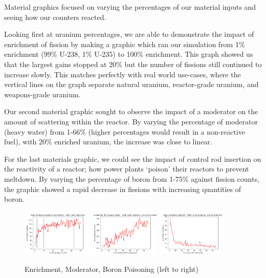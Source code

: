 \documentclass{notes}
\begin{document}
Material graphics focused on varying the percentages of our material inputs and seeing how our counters reacted.

Looking first at uranium percentages, we are able to demonstrate the impact of enrichment of fission by making a graphic which ran our simulation from 1\% enrichment (99\% U-238, 1\% U-235) to 100\% enrichment. This graph showed us that the largest gains stopped at 20\% but the number of fissions still continued to increase slowly. This matches perfectly with real world use-cases, where the vertical lines on the graph separate natural uranium, reactor-grade uranium, and weapons-grade uranium.

Our second material graphic sought to observe the impact of a moderator on the amount of scattering within the reactor. By varying the percentage of moderator (heavy water) from 1-66\% (higher percentages would result in a non-reactive fuel), with 20\% enriched uranium, the increase was close to linear.

For the last materials graphic, we could see the impact of control rod insertion on the reactivity of a reactor; how power plants `poison' their reactors to prevent meltdown. By varying the percentage of boron from 1-75\% against fission counts, the graphic showed a rapid decrease in fissions with increasing quantities of boron.

\begin{figure}[H]
    \centering
    \includegraphics[width = 0.3\textwidth]{enrichment.png}
    \includegraphics[width = 0.3\textwidth]{heavy_water.png}
    \includegraphics[width = 0.3\textwidth]{boron.png}
    \caption{Enrichment, Moderator, Boron Poisoning (left to right)}
\end{figure}
\end{document}
